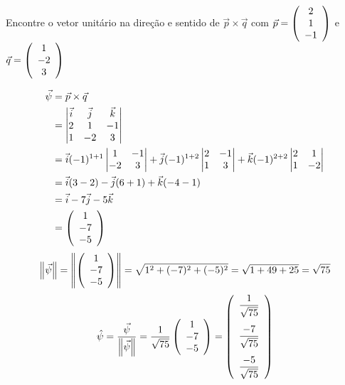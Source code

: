 \documentclass[a4paper,12pt,fleqn]{article}
\begin{document}
Encontre o vetor unitário na direção e sentido de $\vec{p}\times\vec{q}$ com
$
  \vec{p} = \left(\begin{array}{c} 2 \\ 1 \\ -1 \end{array}\right)
$ e
$
  \vec{q} = \left(\begin{array}{c} 1 \\ -2 \\ 3 \end{array}\right)
$
\begin{answer}
  \begin{align*}
    \vec{\psi}
    & = \vec{p}\times\vec{q} \\
    & = \begin{vmatrix}
        \vec{i} & \vec{j} & \vec{k} \\
        2       & 1       & -1      \\
        1       & -2      & 3
      \end{vmatrix}
    \\
    & = \vec{i} (-1)^{1+1}
      \begin{vmatrix}
        1  & -1 \\
        -2 & 3
      \end{vmatrix}
      + \vec{j} (-1)^{1+2}
      \begin{vmatrix}
        2 & -1 \\
        1 & 3
      \end{vmatrix}
      + \vec{k} (-1)^{2+2}
      \begin{vmatrix}
        2 & 1 \\
        1 & -2
      \end{vmatrix}
    \\
    & = \vec{i} ( 3 - 2)
      - \vec{j} ( 6 + 1)
      + \vec{k} (-4 - 1)
    \\
    & = \vec{i} - 7\vec{j} -5 \vec{k} \\
    & = \left(\begin{array}{c} 1 \\ -7 \\ -5 \end{array}\right)
  \end{align*}
  \[
    \norm{\vec{\psi}}
    = \norm{\vetortri{1}{-7}{-5}}
    = \sqrt{1^2 + (-7)^2 + (-5)^2}
    = \sqrt{1 + 49 + 25}
    = \sqrt{75}
  \]
  \[
    \hat{\psi}
    = \frac{\vec{\psi}}{\norm{\vec{\psi}}}
    = \frac{1}{\sqrt{75}} \vetortri{1}{-7}{-5}
    = \Vetortri{\frac{1}{\sqrt{75}}}{\frac{-7}{\sqrt{75}}}{\frac{-5}{\sqrt{75}}}
  \]

\end{answer}

\end{document}
